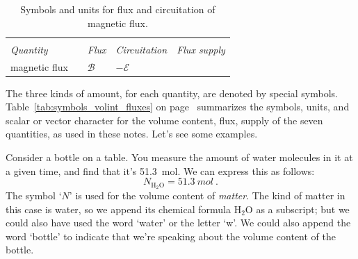 \documentclass[a4paper,12pt,%
onecolumn,oneside,%
british%
]{memoir}
\renewcommand*{\|}[1][]{\nonscript\:#1\vert\nonscript\:\mathopen{}}
\newcommand*{\yN}{N}
\newcommand*{\yBf}{\mathcal{B}}
\newcommand*{\yEv}{\mathcal{E}}
\begin{document}
\begin{table}
  \vspace{10em}

  \begin{tabular*}{\linewidth}{@{\extracolsep{\fill}}lclll}
    \hline\\[-1ex]
    \textit{Quantity}&& \textit{Flux\enskip[unit]} & \textit{Circuitation\enskip[unit]} & \textit{Flux supply}
    \\[4ex]
    magnetic flux&&$\yBf$\enskip[\unit{Wb}] &$-\yEv$ &
    \\[2ex]
    \hline
  \end{tabular*}
  \caption{Symbols and units for flux and circuitation of magnetic flux.}
  \label{tab:symbols_flux_circuit}
\end{table}


The three kinds of amount, for each quantity, are denoted by special symbols. Table~\ref{tab:symbols_volint_fluxes} on page~\pageref{tab:symbols_volint_fluxes} summarizes the symbols, units, and scalar or vector character for the volume content, flux, supply of the seven quantities, as used in these notes. Let's see some examples.

\medskip

%
%
Consider a bottle on a table. You measure the amount of water molecules in it at a given time, and find that it's \qty{51.3}{mol}. We can express this as follows:
\begin{equation*}
  \yN_{\mathrm{H_2O}} = \qty{51.3}{mol} \ .
\end{equation*}
The symbol \enquote*{$\yN$} is used for the volume content of \emph{matter}. The kind of matter in this case is water, so we append its chemical formula $\mathrm{H_2O}$ as a subscript; but we could also have used the word \enquote*{water} or the letter \enquote*{w}. We could also append the word \enquote*{bottle} to indicate that we're speaking about the volume content of the bottle.
\end{document}
